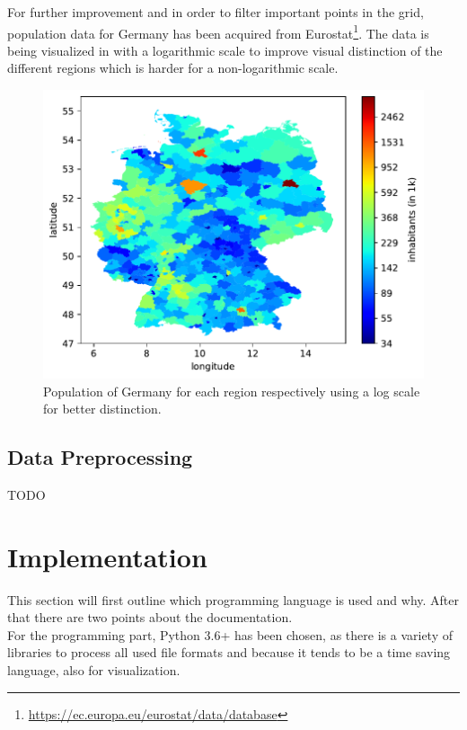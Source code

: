 For further improvement and in order to filter important points in the grid, population data for Germany has been acquired from Eurostat\footnote{\url{https://ec.europa.eu/eurostat/data/database}}. The data is being visualized in  with a logarithmic scale to improve visual distinction of the different regions which is harder for a non-logarithmic scale.\\

\begin{figure}[h!]%
\centering
\includegraphics[width=\textwidth]{plots/demo/demo2018_logscale}%
\caption{Population of Germany for each region respectively using a log scale for better distinction.}%
\label{fig:demo2018_logscale}%
\end{figure}


\subsection*{Data Preprocessing}

TODO


\section{Implementation}
\label{sec:prog}

This section will first outline which programming language is used and why. After that there are two points about the documentation.\\

For the programming part, Python 3.6+ has been chosen, as there is a variety of libraries to process all used file formats and because it tends to be a time saving language, also for visualization.\\

